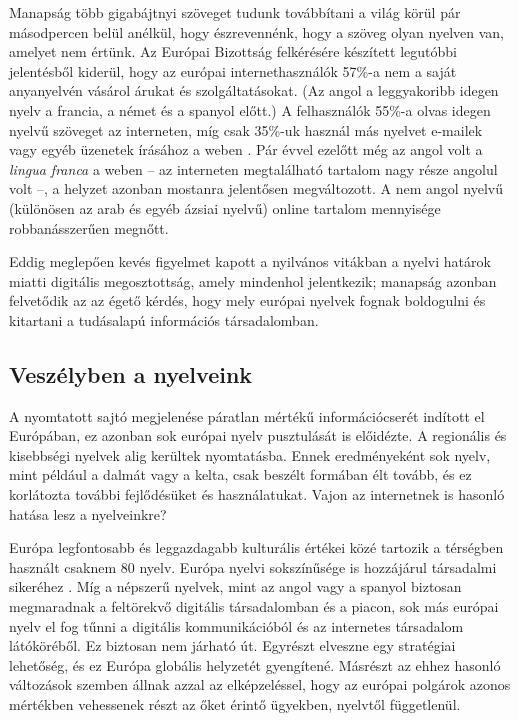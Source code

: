 \begin{multicols}{2}
  Manapság több gigabájtnyi szöveget tu\-dunk továbbítani a világ körül pár másodpercen belül anélkül, hogy észrevennénk, hogy a szöveg olyan nyelven van, amelyet nem értünk. Az Európai Bizottság felkérésére készített legutóbbi jelentésből kiderül, hogy az európai internethasználók 57\%-a nem a saját anyanyelvén vásárol árukat és szolgáltatásokat. (Az angol a leggyakoribb idegen nyelv a francia, a német és a spanyol előtt.) A felhasználók 55\%-a olvas idegen nyelvű szöveget az interneten, míg csak 35\%-uk használ más nyelvet e-mailek vagy egyéb üzenetek írásához a weben \cite{EC1}.  Pár évvel ezelőtt még az angol volt a \textit{lingua franca} a weben -- az interneten megtalálható tartalom nagy része angolul volt --, a helyzet azonban mostanra jelentősen megváltozott. A nem angol nyelvű (különösen az arab és egyéb ázsiai nyelvű) online tartalom mennyisége rob\-ba\-nás\-sze\-rű\-en megnőtt. 

  Eddig meglepően kevés figyelmet kapott a nyilvános vitákban a nyelvi határok miatti digitális megosztottság, amely mindenhol jelentkezik; manapság azonban felvetődik az az égető kérdés, hogy mely európai nyelvek fognak boldogulni és kitartani a tudásalapú információs társadalomban. 

  \subsection{Veszélyben a nyelveink}

  A nyomtatott sajtó megjelenése páratlan mértékű információcserét indított el Európában, ez azonban sok európai nyelv pusztulását is előidézte. A regionális és kisebbségi nyelvek alig kerültek nyom\-ta\-tás\-ba. Ennek eredményeként sok nyelv, mint például a dalmát vagy a kelta, csak beszélt formában élt tovább, és ez korlátozta további fejlődésüket és használatukat. Vajon az internetnek is hasonló hatása lesz a nyelveinkre?

  Európa legfontosabb és leggazdagabb kulturális értékei közé tartozik a térségben használt csaknem 80 nyelv. Európa nyelvi sokszínűsége is hozzájárul társadalmi si\-ke\-ré\-hez \cite{EC2}.  Míg a népszerű nyelvek, mint az angol vagy a spanyol biztosan megmaradnak a feltörekvő digitális társadalomban és a piacon, sok más európai nyelv el fog tűnni a digitális kommunikációból és az internetes társadalom látóköréből. Ez biztosan nem járható út. Egyrészt elveszne egy stratégiai lehetőség, és ez Európa globális helyzetét gyengítené. Másrészt az ehhez hasonló változások szemben állnak azzal az elképzeléssel, hogy az európai polgárok azonos mértékben vehessenek részt az őket érintő ügyekben, nyelvtől függetlenül.


\end{multicols}
